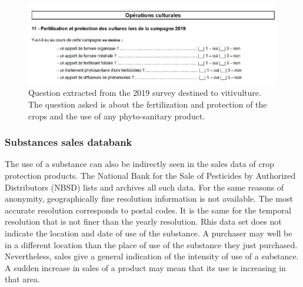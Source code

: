 \begin{figure}[ht]
    \centering
    \includegraphics[scale=0.75]{figs/Chap3/PK1.pdf}
    \caption{Question extracted from the 2019 survey destined to vitivulture. The question asked is about the fertilization and protection of the crops and the use of any phyto-sanitary product.}
    \label{fig:PK1}
\end{figure}

\subsubsection{Substances sales databank}

The use of a substance can also be indirectly seen in the sales data of crop protection products. The National Bank for the Sale of Pesticides by Authorized Distributors (NBSD) \cite{BNVD} lists and archives all such data. For the same reasons of anonymity, geographically fine resolution information is not available. The most accurate resolution corresponds to postal codes. It is the same for the temporal resolution that is not finer than the yearly resolution. Rhis data set does not indicate the location and date of use of the substance. A purchaser may well be in a different location than the place of use of the substance they just purchased. Nevertheless, sales give a general indication of the intensity of use of a substance. A sudden increase in sales of a product may mean that its use is increasing in that area.  

